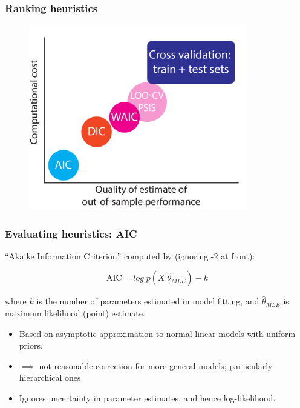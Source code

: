 \documentclass[handout]{beamer}
\begin{document}
\begin{frame}
	\frametitle{Ranking heuristics}
	
	\begin{figure}[ht]
		\centerline{\includegraphics[width=0.85\textwidth]{figures/lec7_conceptMetrics.pdf}}
	\end{figure}
	
\end{frame}

\begin{frame}
	\frametitle{Evaluating heuristics: AIC}
	 ``Akaike Information Criterion'' computed by (ignoring -2 at front):
	
	\begin{equation}
	\text{AIC} = log \;p(X|\hat{\theta}_{MLE}) - k
	\end{equation}
	
	 where $k$ is the number of parameters estimated in model fitting, and $\hat{\theta}_{MLE}$ is maximum likelihood (point) estimate.
	
	\begin{itemize}
		\item<5-> Based on asymptotic approximation to normal linear models with uniform priors.
		\item<6-> $\implies$ not reasonable correction for more general models; particularly hierarchical ones.
		\item<7-> Ignores uncertainty in parameter estimates, and hence log-likelihood.
	\end{itemize}

\end{frame}
\end{document}

